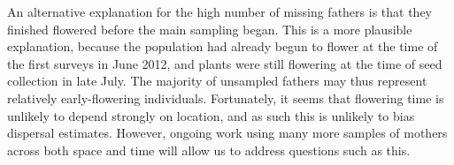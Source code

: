 \documentclass[10pt, a4paper, twocolumn]{article} %
\begin{document}
An alternative explanation for the high number of missing fathers is that they finished flowered before the main sampling began.
This is a more plausible explanation, because the population had already begun to flower at the time of the first surveys in June 2012, and plants were still flowering at the time of seed collection in late 
July.
The majority of unsampled fathers may thus represent relatively early-flowering individuals.
Fortunately, it seems that flowering time is unlikely to depend strongly on location, and as such this is unlikely to bias dispersal estimates.
However, ongoing work using many more samples of mothers across both space and time will allow us to address questions such as this.



\end{document}
